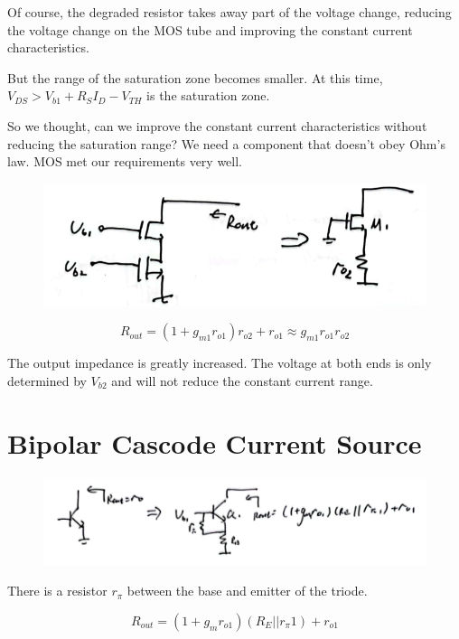 \documentclass[fontset=windows]{article}
\begin{document}
Of course, the degraded resistor takes away part of the voltage change, reducing the voltage change on the MOS tube and improving the constant current characteristics. 

But the range of the saturation zone becomes smaller. At this time, $V_{DS}>V_{b1}+R_SI_D-V_{TH}$ is the saturation zone. 

So we thought, can we improve the constant current characteristics without reducing the saturation range? We need a component that doesn't obey Ohm's law. MOS met our requirements very well. 

\begin{figure}[htbp]
    \centering
    \includegraphics[scale=0.7]{4.jpg}
    \captionsetup{labelformat=empty}
    \caption{}
    \label{4}
\end{figure}

$$R_{out}=(1+g_{m1}r_{o1})r_{o2}+r_{o1}\approx g_{m1}r_{o1}r_{o2}$$

The output impedance is greatly increased. The voltage at both ends is only determined by $V_{b2}$ and will not reduce the constant current range. 

\section*{Bipolar Cascode Current Source}

\begin{figure}[htbp]
    \centering
    \includegraphics[scale=0.7]{5.jpg}
    \captionsetup{labelformat=empty}
    \caption{}
    \label{5}
\end{figure}

There is a resistor $r_\pi$ between the base and emitter of the triode. 

$$R_{out}=(1+g_mr_{o1})(R_E||r_\pi1)+r_{o1}$$
\end{document}
